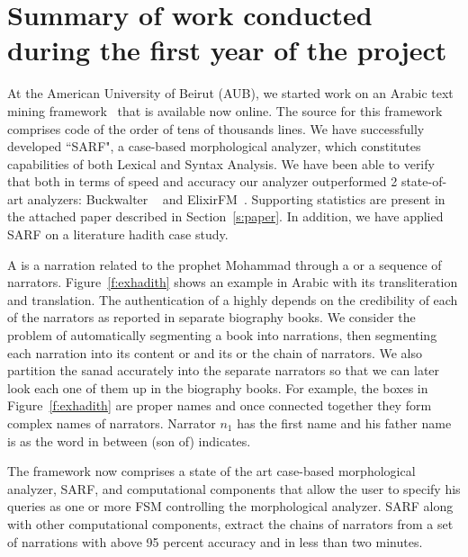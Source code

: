 \documentclass[12pt]{article}
\newcommand{\noArRL}[1]{\arabfalse\RL{#1}\arabtrue}
\newcommand{\noTrRL}[1]{\transfalse\RL{#1}\transtrue}
\begin{document}
\section{Summary of work conducted during the first year of the project}
\label{s:prelim}

At the American University of Beirut (AUB), we
started work on an Arabic text mining framework~\cite{ATMine09}
that is available now online. The source for this framework comprises code of the order of tens of thousands lines.
We have successfully developed ``SARF", a case-based morphological 
analyzer, which constitutes capabilities of both Lexical and Syntax Analysis. We have been able to verify that both in terms of speed and accuracy our analyzer outperformed 2 state-of-art analyzers: Buckwalter ~\cite{Buckwalter:02} and ElixirFM~\cite{Otakar:07}. Supporting statistics are present in the attached paper described in Section~\ref{s:paper}. In addition, we have applied SARF on a literature hadith case study.

A  is a narration related to the prophet Mohammad
through a  or a sequence of narrators. 
Figure~\ref{f:exhadith} shows an example \noArRL{.hady_t} in Arabic with its 
transliteration and translation. 
The authentication of a \noArRL{.hady_t} highly depends on the credibility
of each of the narrators as reported in separate biography 
books. 
We consider the problem of automatically segmenting
a \noArRL{.hady_t} book into narrations, then segmenting each 
narration into
its content or  and its \noArRL{sanad} or the
chain of narrators.
We also partition the sanad accurately into the 
separate narrators so that we can later look each one of them 
up in the biography books. 
For example, the boxes in Figure~\ref{f:exhadith} are proper names 
and once
connected together they form complex names of narrators. 
Narrator $n_1$ has the first name \noTrRL{qtybT} and his father 
name is \noTrRL{s`yd} as the word in between 
\noTrRL{bn} (son of) indicates. 

\transfalse
\begin{figure}[tb]
\end{figure}
\transtrue

The framework now comprises a state of the art
case-based morphological analyzer, SARF, 
and computational components that allow the user to
specify his queries as one or more FSM
controlling the morphological analyzer.
SARF along with other computational components, 
extract the chains of narrators from a set of narrations
with above 95 percent accuracy and in less than two minutes. 
\end{document}
